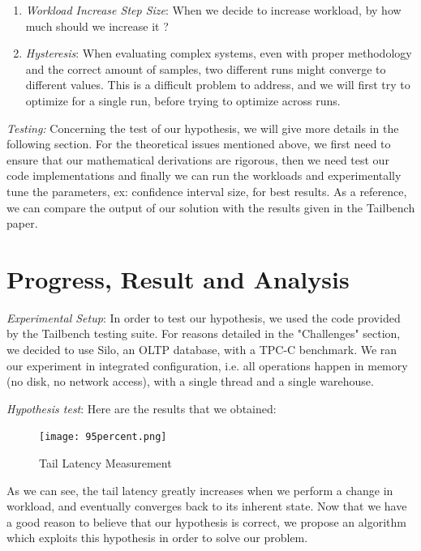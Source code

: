 \documentclass[12pt]{article}
\begin{document}
\begin{enumerate}
	\item \textit{Workload Increase Step Size}: When we decide to increase workload, by how much should we increase it ?

	\item \textit{Hysteresis}: When evaluating complex systems, even with proper methodology and the correct amount of samples, two different runs might converge to different values. This is a difficult problem to address, and we will first try to optimize for a single run, before trying to optimize across runs.
\end{enumerate}

\noindent \textit{Testing:} Concerning the test of our hypothesis, we will give more details in the following section. For the theoretical issues mentioned above, we first need to ensure that our mathematical derivations are rigorous, then we need test our code implementations and finally we can run the workloads and experimentally tune the parameters, ex: confidence interval size, for best results. As a reference, we can compare the output of our solution with the results given in the Tailbench paper.

\section{Progress, Result and Analysis}

\textit{Experimental Setup}: In order to test our hypothesis, we used the code provided by the Tailbench testing suite. For reasons detailed in the "Challenges" section, we decided to use Silo, an OLTP database, with a TPC-C benchmark. We ran our experiment in integrated configuration, i.e. all operations happen in memory (no disk, no network access), with a single thread and a single warehouse.

\singlespacing
\noindent \textit{Hypothesis test}:
\noindent Here are the results that we obtained:

\begin{figure}[H]
  \centering
  \texttt{[image: 95percent.png]}
  \caption{Tail Latency Measurement}
  \label{fig:sample}
\end{figure}

\noindent As we can see, the tail latency greatly increases when we perform a change in workload, and eventually converges back to its inherent state. Now that we have a good reason to believe that our hypothesis is correct, we propose an algorithm which exploits this hypothesis in order to solve our problem.
\end{document}
